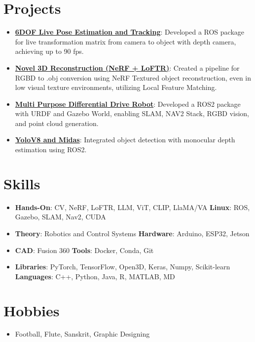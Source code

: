 \documentclass[letterpaper,11pt]{article}
\newcommand{\resumeItem}[2]{
  \item\small{
    \textbf{#1}{: #2 \vspace{-2pt}}
  }
}
\newcommand{\resumeSubItem}[2]{\resumeItem{#1}{#2}\vspace{-4pt}}
\newcommand{\resumeSubHeadingListStart}{\begin{itemize}[leftmargin=*]}
\newcommand{\resumeSubHeadingListEnd}{\end{itemize}}
\begin{document}
\section{Projects}
  \resumeSubHeadingListStart
    \resumeSubItem{\href{https://github.com/Kaivalya192/live-pose-ros}{6DOF Live Pose Estimation and Tracking}}
      {Developed a ROS package for live transformation matrix from camera to object with depth camera, achieving up to 90 fps.}
    \resumeSubItem{\href{https://github.com/Kaivalya192/Object_Reconstruction}{Novel 3D Reconstruction (NeRF + LoFTR)}}
      {Created a pipeline for RGBD to .obj conversion using NeRF Textured object reconstruction, even in low visual texture environments, utilizing Local Feature Matching.}
    \resumeSubItem{\href{https://github.com/Kaivalya192/bot_spawn}{Multi Purpose Differential Drive Robot}}
      {Developed a ROS2 package with URDF and Gazebo World, enabling SLAM, NAV2 Stack, RGBD vision, and point cloud generation.}
    \resumeSubItem{\href{https://github.com/Kaivalya192/midas_ros2}{YoloV8 and Midas}}
      {Integrated object detection with monocular depth estimation using ROS2.}
  \resumeSubHeadingListEnd

\section{Skills}
 \resumeSubHeadingListStart
   \item{
     \textbf{Hands-On}{: CV, NeRF, LoFTR, LLM, ViT, CLIP, LlaMA/VA}
     \hfill
     \textbf{Linux}{: ROS, Gazebo, SLAM, Nav2, CUDA}
   }
   \item{
     \textbf{Theory}{: Robotics and Control Systems}
     \hfill
     \textbf{Hardware}{: Arduino, ESP32, Jetson}
   }
   \item{
     \textbf{CAD}{: Fusion 360}
     \hfill
     \textbf{Tools}{: Docker, Conda, Git}
   }
   \item{
     \textbf{Libraries}{: PyTorch, TensorFlow, Open3D, Keras, Numpy, Scikit-learn}
     \hfill
     \textbf{Languages}{: C++, Python, Java, R, MATLAB, MD}
   }
 \resumeSubHeadingListEnd

\section{Hobbies}
  \resumeSubHeadingListStart
    \item{Football, Flute, Sanskrit, Graphic Designing}
  \resumeSubHeadingListEnd

\end{document}
